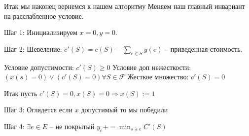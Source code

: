 Итак мы наконец вернемся к нашем алгоритму
Меняем наш главный инвариант на расслабленное условие.

Шаг 1:
Инициализируем $x = 0, y = 0$.

Шаг 2:
Шевеление:
$c'(S) = c(S) - \sum_{e \in S} y(e)$ -- приведенная стоимость.

Условие допустимости: $c'(S) \geq 0$
Условие доп нежесткости: $(x(s) = 0) \vee (c'(S) = 0) \forall S \in \mathcal{F}$
Жесткое множество: $c'(S) = 0$

Итак пусть $c'(S) = 0, x(S) = 0 \Rightarrow x(S) := 1$

Шаг 3:
Оглядется если $x$ допустимый то мы победили

Шаг 4:
$\exists e \in E$ -- не покрытый
$y_e += \min_{s \ni e} C'(S)$